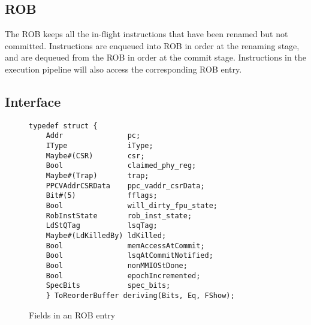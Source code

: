 \subsection{ROB}\label{sec:rob}

The ROB keeps all the in-flight instructions that have been renamed but not committed.
Instructions are enqueued into ROB in order at the renaming stage, and are dequeued from the ROB in order at the commit stage.
Instructions in the execution pipeline will also access the corresponding ROB entry.

\subsection{Interface}

\begin{figure}[!htb]
    \begin{lstlisting}[caption={}]
    typedef struct {
    Addr               pc;
    IType              iType;
    Maybe#(CSR)        csr;
    Bool               claimed_phy_reg;
    Maybe#(Trap)       trap;
    PPCVAddrCSRData    ppc_vaddr_csrData;
    Bit#(5)            fflags;
    Bool               will_dirty_fpu_state;
    RobInstState       rob_inst_state;
    LdStQTag           lsqTag;
    Maybe#(LdKilledBy) ldKilled;
    Bool               memAccessAtCommit;
    Bool               lsqAtCommitNotified;
    Bool               nonMMIOStDone;
    Bool               epochIncremented;
    SpecBits           spec_bits;
    } ToReorderBuffer deriving(Bits, Eq, FShow);
    \end{lstlisting}
    \caption{Fields in an ROB entry}\label{fig:rob-entry}
\end{figure}

